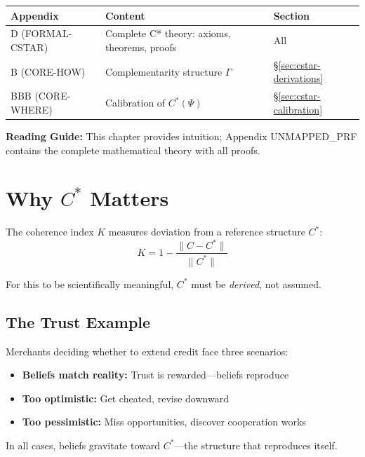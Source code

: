 \begin{tcolorbox}[
    colback=yellow!10!white,
    colframe=orange!75!black,
    title={\textbf{Appendix References for This Chapter}},
    fonttitle=\bfseries
]
\begin{tabular}{lll}
\textbf{Appendix} & \textbf{Content} & \textbf{Section} \\
\midrule
D (FORMAL-CSTAR) & Complete C* theory: axioms, theorems, proofs & All \\
B (CORE-HOW) & Complementarity structure $\Gamma$ & \S\ref{sec:cstar-derivations} \\
BBB (CORE-WHERE) & Calibration of $C^*(\Psi)$ & \S\ref{sec:cstar-calibration}
\end{tabular}

\medskip
\textbf{Reading Guide:} This chapter provides intuition; Appendix UNMAPPED_PRF contains
the complete mathematical theory with all proofs.
\end{tcolorbox}



\section{Why $C^*$ Matters}
\label{sec:cstar-intro}

The coherence index $K$ measures deviation from a reference structure $C^*$:
\begin{equation}
\label{eq:coherence-index}
K = 1 - \frac{\|C - C^*\|}{\|C^*\|}
\end{equation}

For this to be scientifically meaningful, $C^*$ must be \emph{derived}, not assumed.

\subsection{The Trust Example}
\label{sec:ch6-trust-example}

\begin{intuition}
Merchants deciding whether to extend credit face three scenarios:
\begin{itemize}[nosep]
    \item \textbf{Beliefs match reality:} Trust is rewarded---beliefs reproduce
    \item \textbf{Too optimistic:} Get cheated, revise downward
    \item \textbf{Too pessimistic:} Miss opportunities, discover cooperation works
\end{itemize}
In all cases, beliefs gravitate toward $C^*$---the structure that reproduces itself.
\end{intuition}

